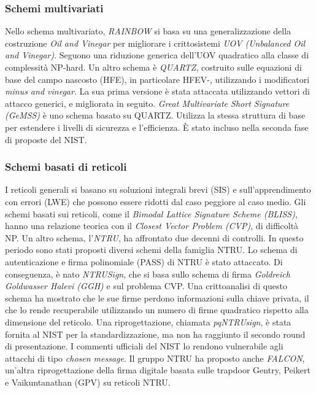 \subsubsection{Schemi multivariati}
Nello schema multivariato, \textit{RAINBOW} si basa su una generalizzazione della costruzione \textit{Oil and Vinegar} per migliorare i crittosistemi \textit{UOV (Unbalanced Oil and Vinegar)}. Seguono una riduzione generica dell'UOV quadratico alla classe di complessità NP-hard. Un altro schema è \textit{QUARTZ}, costruito sulle equazioni di base del campo nascosto (HFE), in particolare HFEV-, utilizzando i modificatori \textit{minus and vinegar}. La sua prima versione è stata attaccata utilizzando vettori di attacco generici, e migliorata in seguito. \textit{Great Multivariate Short Signature (GeMSS)} è uno schema basato su QUARTZ. Utilizza la stessa struttura di base per estendere i livelli di sicurezza e l'efficienza. È stato incluso nella seconda fase di proposte del NIST.

\subsubsection{Schemi basati di reticoli}
I reticoli generali si basano su soluzioni integrali brevi (SIS) e sull'apprendimento con errori (LWE) che possono essere ridotti dal caso peggiore al caso medio. Gli schemi basati sui reticoli, come il \textit{Bimodal Lattice Signature Scheme (BLISS)}, hanno una relazione teorica con il \textit{Closest Vector Problem (CVP)}, di difficoltà NP. Un altro schema, l'\textit{NTRU}, ha affrontato due decenni di controlli. In questo periodo sono stati proposti diversi schemi della famiglia NTRU. Lo schema di autenticazione e firma polinomiale (PASS) di NTRU è stato attaccato. Di conseguenza, è nato \textit{NTRUSign}, che si basa sullo schema di firma \textit{Goldreich Goldwasser Halevi (GGH)} e sul problema CVP. Una crittoanalisi di questo schema ha mostrato che le sue firme perdono informazioni sulla chiave privata, il che lo rende recuperabile utilizzando un numero di firme quadratico rispetto alla dimensione del reticolo. Una riprogettazione, chiamata \textit{pqNTRUsign}, è stata fornita al NIST per la standardizzazione, ma non ha raggiunto il secondo round di presentazione. I commenti ufficiali del NIST lo rendono vulnerabile agli attacchi di tipo \textit{chosen message}. Il gruppo NTRU ha proposto anche \textit{FALCON}, un'altra riprogettazione della firma digitale basata sulle trapdoor Gentry, Peikert e Vaikuntanathan (GPV) su reticoli NTRU.

